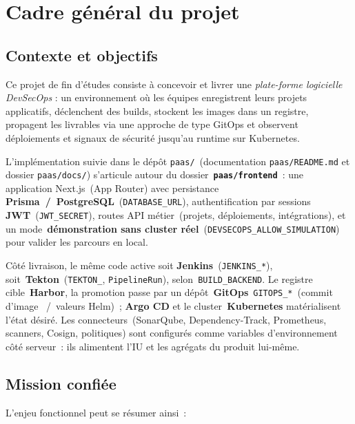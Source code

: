 
\chapter{Cadre général du projet}
\label{ch:cadre}

\section{Contexte et objectifs}

Ce projet de fin d'études consiste à concevoir et livrer une \emph{plate-forme logicielle DevSecOps} : un environnement où les équipes enregistrent leurs projets applicatifs, déclenchent des builds, stockent les images dans un registre, propagent les livrables via une approche de type GitOps et observent déploiements et signaux de sécurité jusqu'au runtime sur Kubernetes.

L'implémentation suivie dans le dépôt \texttt{paas/}~(documentation \texttt{paas/README.md} et dossier \texttt{paas/docs/}) s'articule autour du dossier~\textbf{\texttt{paas/frontend}}~: une application Next.js~(App Router) avec persistance \textbf{Prisma~/~PostgreSQL}~(\texttt{DATABASE\_URL}), authentification par sessions \textbf{JWT}~(\texttt{JWT\_SECRET}), routes API métier~(projets, déploiements, intégrations), et un mode~\textbf{démonstration sans cluster réel}~(\texttt{DEVSECOPS\_ALLOW\_SIMULATION}) pour valider les parcours en local.

Côté livraison, le même code active soit \textbf{Jenkins}~(\texttt{JENKINS\_*}), soit~\textbf{Tekton}~(\texttt{TEKTON\_\*}, \texttt{PipelineRun}), selon~\texttt{BUILD\_BACKEND}. Le registre cible~\textbf{Harbor}, la promotion passe par un dépôt~\textbf{GitOps}~\texttt{GITOPS\_*}~(commit d'image ~/~valeurs Helm)~; \textbf{Argo CD} et le cluster~\textbf{Kubernetes} matérialisent l'état désiré. Les connecteurs~(SonarQube, Dependency-Track, Prometheus, scanners, Cosign, politiques) sont configurés comme variables d'environnement côté serveur~: ils alimentent l'IU et les agrégats du produit lui-même.

\section{Mission confiée}

L'enjeu fonctionnel peut se résumer ainsi~:

